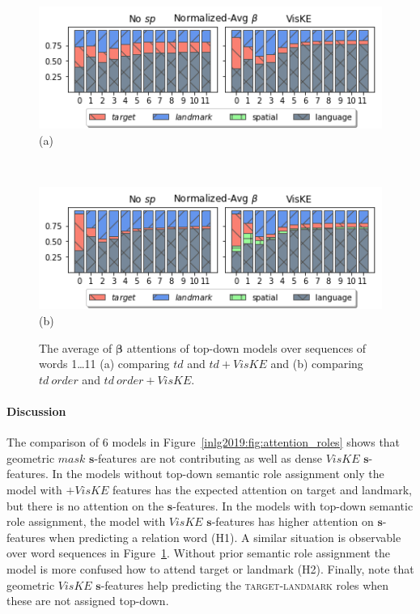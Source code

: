 \begin{figure}[ht!]
	\centering
	\begin{minipage}{0.85\linewidth}
		\centering
		\includegraphics[width=\columnwidth]{studies/inlg2019/figures/results/attentions/random_all.png}\\
		(a)
	\end{minipage}\\
	\begin{minipage}{0.85\linewidth}
		\centering
		\includegraphics[width=\columnwidth]{studies/inlg2019/figures/results/attentions/order_all.png}\\
		(b)
	\end{minipage}%
	\caption{The average of $\bm{\beta}$ attentions of top-down models over sequences of words 1\ldots 11 (a) comparing $td$ and $td+VisKE$ and (b) comparing $td~order$ and $td~order+VisKE$. %
	} %
	\label{inlg2019:fig:attention_trend}
\end{figure}


\paragraph{Discussion}
The comparison of 6 models in Figure~\ref{inlg2019:fig:attention_roles} shows
that geometric $mask$ $\bm{s}$-features are not contributing as well
as dense $VisKE$ $\bm{s}$-features. %
In the models without top-down semantic role assignment %
only the model with $+VisKE$ features has the expected attention on
target and landmark, but there is no attention on the
$\bm{s}$-features.  In the models with top-down semantic role
assignment, the model with $VisKE$ $\bm{s}$-features has higher
attention on $\bm{s}$-features when predicting a relation word (H1). A
similar situation is observable over word sequences in
Figure~\ref{inlg2019:fig:attention_trend}. Without prior semantic role
assignment the model is more confused how to attend target or landmark
(H2). Finally, note that %
geometric $VisKE$ $\bm{s}$-features help predicting the
\textsc{target}-\textsc{landmark} roles when these are not assigned
top-down. %







